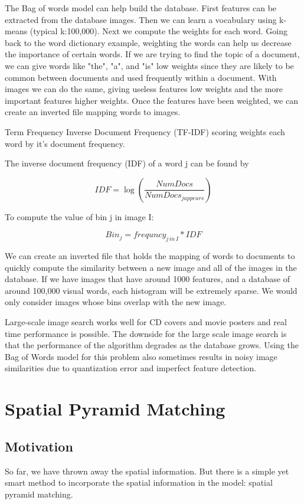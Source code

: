 \documentclass{article}
\begin{document}
The Bag of words model can help build the database.  First features can be extracted from the database images. Then we can learn a vocabulary using k-means (typical k:100,000).  Next we compute the weights for each word.  Going back to the word dictionary example, weighting the words can help us decrease the importance of certain words.  If we are trying to find the topic of a document, we can give words like "the", "a", and "is" low weights since they are likely to be common between documents and used frequently within a document.  With images we can do the same, giving useless features low weights and the more important features higher weights.  Once the features have been weighted, we can create an inverted file mapping words to images.

Term Frequency Inverse Document Frequency (TF-IDF) scoring weights each word by it's document frequency.  

The inverse document frequency (IDF) of a word j can be found by

$$IDF = \log(\frac{NumDocs}{NumDocs_{j appears}})$$

To compute the value of bin j in image I:

$$Bin_{j} = frequncy_{j\,in\,I} * IDF$$

We can create an inverted file that holds the mapping of words to documents to quickly compute the similarity between a new image and all of the images in the database. If we have images that have around 1000 features, and a database of around 100,000 visual words, each histogram will be extremely sparse.  We would only consider images whose bins overlap with the new image.

Large-scale image search works well for CD covers and movie posters and real time performance is possible. The downside for the large scale image search is that the performance of the algorithm degrades as the database grows. Using the Bag of Words model for this problem also sometimes results in noisy image similarities due to quantization error and imperfect feature detection.\cite{Large-scale-collections}
\section{Spatial Pyramid Matching}
\subsection{Motivation}
So far, we have thrown away the spatial information. But there is a simple yet smart method to incorporate the spatial information in the model: spatial pyramid matching.
\end{document}
